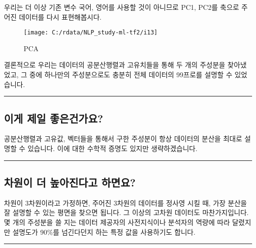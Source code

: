 \documentclass[
]{article}
\begin{document}
우리는 더 이상 기존 변수 국어, 영어를 사용할 것이 아니므로 PC1, PC2를
축으로 주어진 데이터를 다시 표현해봅시다.

\begin{figure}

{\centering \texttt{[image: C:/rdata/NLP\_study-ml-tf2/i13]} 

}

\caption{PCA}\label{fig:unnamed-chunk-17}
\end{figure}

결론적으로 우리는 데이터의 공분산행렬과 고유치들을 통해 두 개의 주성분을
찾아냈었고, 그 중에 하나만의 주성분으로도 충분히 전체 데이터의 99프로를
설명할 수 있었습니다.

\begin{center}\rule{0.5\linewidth}{0.5pt}\end{center}

\hypertarget{uxc774uxac8c-uxc81cuxc77c-uxc88buxc740uxac74uxac00uxc694}{%
\subsection{이게 제일
좋은건가요?}\label{uxc774uxac8c-uxc81cuxc77c-uxc88buxc740uxac74uxac00uxc694}}

공분산행렬과 고유값, 벡터들을 통해서 구한 주성분이 항상 데이터의 분산을
최대로 설명할 수 있습니다. 이에 대한 수학적 증명도 있지만
생략하겠습니다.

\begin{center}\rule{0.5\linewidth}{0.5pt}\end{center}

\hypertarget{uxcc28uxc6d0uxc774-uxb354-uxb192uxc544uxc9c4uxb2e4uxace0-uxd558uxba74uxc694}{%
\subsection{차원이 더 높아진다고
하면요?}\label{uxcc28uxc6d0uxc774-uxb354-uxb192uxc544uxc9c4uxb2e4uxace0-uxd558uxba74uxc694}}

차원이 3차원이라고 가정하면, 주어진 3차원의 데이터를 정사영 시킬 때,
가장 분산을 잘 설명할 수 있는 평면을 찾으면 됩니다. 그 이상의 고차원
데이터도 마찬가지입니다. 몇 개의 주성분을 쓸 지는 데이터 제공자의
사전지식이나 분석자의 역량에 따라 달렸지만 설명도가 90\%를 넘긴다던지
하는 특정 값을 사용하기도 합니다.

\begin{center}\rule{0.5\linewidth}{0.5pt}\end{center}
\end{document}
